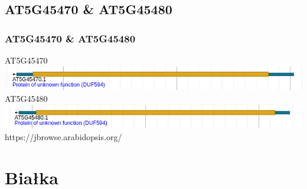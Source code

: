 \documentclass{beamer}
\begin{document}
\subsection{AT5G45470 \& AT5G45480}
\begin{frame}
    \frametitle{AT5G45470 \& AT5G45480}
    \centering
    AT5G45470
    \includegraphics[scale = 0.5]{at5g45470.png}\\
    AT5G45480
    \includegraphics[scale = 0.5]{at5g45480.png}\\
    \hfill \break
    \scriptsize{https://jbrowse.arabidopsis.org/}
\end{frame}

\section{Białka}
\end{document}
